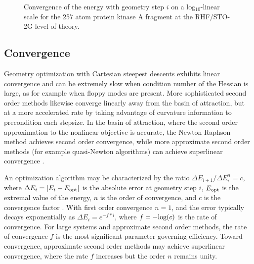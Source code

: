 \documentclass[prl,twocolumn,showpacs,twocolumngrid,superbib]{revtex4}
\begin{document}
\begin{figure}[h]
\caption{
Convergence of the energy with geometry step $i$ on a log$_{10}$-linear  scale for the 
257 atom protein kinase A fragment at the RHF/STO-2G level of theory.}\label{logn-logde} 
\end{figure}

\subsection{Convergence}

Geometry optimization with Cartesian steepest descents exhibits linear convergence and can 
be extremely slow when condition number of the Hessian is large, as for example when floppy 
modes are present.   More sophisticated second order methods likewise converge linearly away 
from the basin of attraction,  but at a more accelerated rate by taking advantage of curvature 
information to precondition each stepsize.  In the basin of attraction, where the second order approximation 
to the nonlinear objective is accurate, the Newton-Raphson method achieves second order convergence, 
while more approximate second order methods (for example quasi-Newton algorithms) can achieve 
superlinear convergence \cite{RFletcher,Pulay_natural_internals}.   

An optimization algorithm may be characterized by the ratio $ {\Delta E_{i+1}}/{\Delta E_{i}^n} =c$,
where $\Delta E_i = |E_{i}-E_{\rm opt}| $ is the absolute error at geometry step $i$,
$E_{\rm opt}$ is the extremal value of the energy, $n$ is the order of convergence, 
and $c$ is the convergence factor \cite{Quarteroni}.  With first order convergence $n=1$, and
the error typically decays exponentially as $\Delta E_i = e^{-f*i}$, where $f=-{\rm log}(c)$ is the 
rate of convergence. For large systems and approximate second order methods, the rate of 
convergence $f$ is the most significant parameter governing efficiency.   Toward convergence,
approximate second order methods may achieve superlinear convergence, where the rate $f$
increases  but the order $n$ remains unity.  
\end{document}
